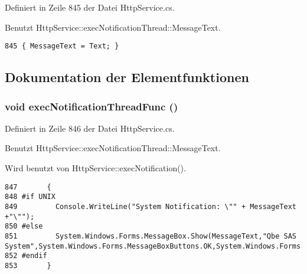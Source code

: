 Definiert in Zeile 845 der Datei Http\-Service.cs.

Benutzt Http\-Service::exec\-Notification\-Thread::Message\-Text.



\footnotesize\begin{verbatim}845 { MessageText = Text; }
\end{verbatim}\normalsize 


\subsection{Dokumentation der Elementfunktionen}
\hypertarget{classQbeSAS_1_1HttpService_1_1execNotificationThread_QbeSAS_1_1HttpService_1_1execNotificationThreada1}{
\subsubsection[execNotificationThreadFunc]{\setlength{\rightskip}{0pt plus 5cm}void exec\-Notification\-Thread\-Func ()}}
\label{classQbeSAS_1_1HttpService_1_1execNotificationThread_QbeSAS_1_1HttpService_1_1execNotificationThreada1}




Definiert in Zeile 846 der Datei Http\-Service.cs.

Benutzt Http\-Service::exec\-Notification\-Thread::Message\-Text.

Wird benutzt von Http\-Service::exec\-Notification().



\footnotesize\begin{verbatim}847       {
848 #if UNIX
849         Console.WriteLine("System Notification: \"" + MessageText +"\"");
850 #else
851         System.Windows.Forms.MessageBox.Show(MessageText,"Qbe SAS System",System.Windows.Forms.MessageBoxButtons.OK,System.Windows.Forms.MessageBoxIcon.Information);
852 #endif
853       }
\end{verbatim}\normalsize 


